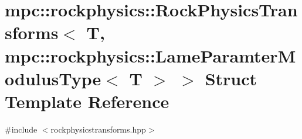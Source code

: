 \hypertarget{structmpc_1_1rockphysics_1_1_rock_physics_transforms_3_01_t_00_01mpc_1_1rockphysics_1_1_lame_para5e1496021e3962f82419b3f52eb8942}{}\section{mpc\+:\+:rockphysics\+:\+:Rock\+Physics\+Transforms$<$ T, mpc\+:\+:rockphysics\+:\+:Lame\+Paramter\+Modulus\+Type$<$ T $>$ $>$ Struct Template Reference}
\label{structmpc_1_1rockphysics_1_1_rock_physics_transforms_3_01_t_00_01mpc_1_1rockphysics_1_1_lame_para5e1496021e3962f82419b3f52eb8942}


{\ttfamily \#include $<$rockphysicstransforms.\+hpp$>$}

